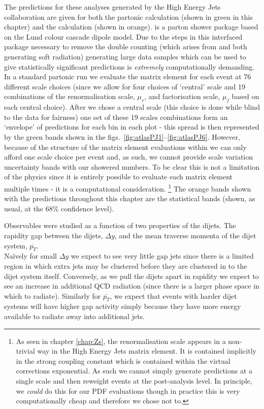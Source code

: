 	The predictions for these analyses generated by the High Energy Jets collaboration
	are given for both the partonic \HEJ calculation (shown in green in this chapter)
	and the \HEJA calculation (shown in orange).
	\ARIADNE is a parton shower package based on the Lund colour cascade dipole model.
	Due to the steps in this interfaced package necessary to remove the double counting
	(which arises from \HEJ and \ARIADNE both generating soft radiation) generating large
	data samples which can be used to give statistically significant predictions is
	\emph{extremely} computationally demanding.  In a standard partonic \HEJ run we
	evaluate the matrix element for each event at 76 different scale choices (since
	we allow for four choices of `central' scale and 19 combinations of the renormalisation
	scale, $\mu_r$, and factorisation scale, $\mu_f$ based on each central choice).
	After we chose a central scale (this choice is done while blind to the data for
	fairness) one set of these 19 scales combinations form an `envelope' of predictions
	for each bin in each plot - this spread is then represented by the green bands shown
	in the figs.~\eqref{fig:atlasPJ1}--\eqref{fig:atlasPJ6}.
	However, because of the structure of the matrix element evaluations within \HEJA
	we can only afford one scale choice per event and, as such, we cannot provide
	scale variation uncertainty bands with our showered numbers.  To be clear this
	is not a limitation of the physics since it is entirely possible to evaluate
	each matrix element multiple times - it is a computational consideration. \footnote{
	As seen in chapter \eqref{chap:Zs}, the renormalisation scale appears in a non-trivial way
	in the High Energy Jets matrix element.  It is contained implicitly in the strong coupling
	constant which is contained within the virtual corrections exponential.  As such
	we cannot simply generate predictions at a single scale and then reweight events
	at the post-analysis level.  In principle, we \emph{could} do this for our PDF
	evaluations though in practice this is very computationally cheap and therefore we
	chose not to.}  The orange bands shown with the \HEJA predictions throughout this
	chapter are the statistical bands (shown, as usual, at the 68\% confidence level).

	Observables were studied
	as a function of two properties of the dijets.  The rapidity gap between the dijets,
	$\Delta y$, and the mean traverse momenta of the dijet system, $\overline{p_T}$.\\
	Na\"ively for small $\Delta y$ we expect to see very little gap jets since there is
	a limited region in which extra jets may be clustered before they are clustered in
	to the dijet system itself.   Conversely, as we pull the dijets apart in rapidity
	we expect to see an increase in additional QCD radiation (since there is a larger
	phase space in which to radiate).  Similarly for $\overline{p_T}$, we expect that
	events with harder dijet systems will have higher gap activity simply because they
	have more energy available to radiate away into additional jets.

